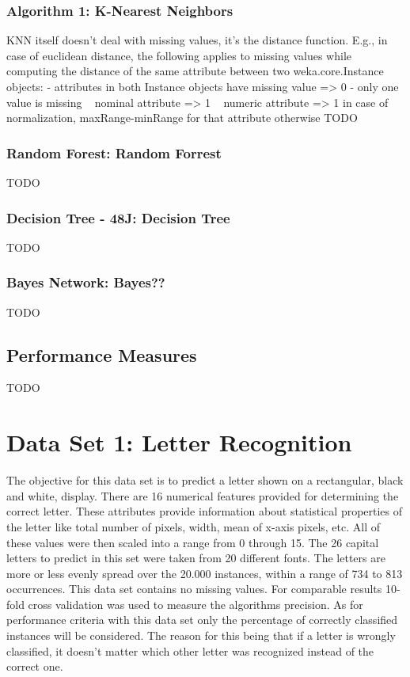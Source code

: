 \documentclass{sig-alternate-05-2015}
\begin{document}
\subsubsection{Algorithm 1: K-Nearest Neighbors}
KNN itself doesn't deal with missing values, it's the distance 
function. E.g., in case of euclidean distance, the following applies 
to missing values while computing the distance of the same attribute 
between two weka.core.Instance objects: 
- attributes in both Instance objects have missing value 
  => 0 
- only one value is missing 
  ~ nominal attribute 
    => 1 
  ~ numeric attribute 
    => 1 in case of normalization, maxRange-minRange for that 
attribute otherwise 
TODO\\
\subsubsection{Random Forest: Random Forrest}
TODO\\
\subsubsection{Decision Tree - 48J: Decision Tree}
TODO\\
\subsubsection{Bayes Network: Bayes??}
TODO\\

\subsection{Performance Measures}
TODO\\

\section{Data Set 1: Letter Recognition}
The objective for this data set is to predict a letter shown on a rectangular, black and white, display. There are 16 numerical features  provided for determining the correct letter. These attributes provide information about statistical properties of the letter like total number of pixels, width, mean of x-axis pixels, etc.
All of these values were then scaled into a range from 0 through 15. The 26 capital letters to predict in this set were taken from 20 different fonts. The letters are more or less evenly spread over the 20.000 instances, within a range of 734 to 813 occurrences. This data set contains no missing values. For comparable results 10-fold cross validation was used to measure the algorithms precision.
As for performance criteria with this data set only the percentage of correctly classified instances will be considered. The reason for this being that if a letter is wrongly classified, it doesn't matter which other letter was recognized instead of the correct one. 
\\
\end{document}
